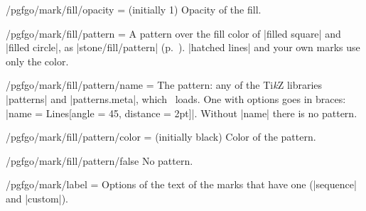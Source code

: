 \begin{key}{/pgfgo/mark/fill/opacity =  (initially 1)}
	Opacity of the fill.

	\begin{codeexample}[width=4cm]

		\begin{goban}[3]
		\end{goban}
	\end{codeexample}
\end{key}


\begin{key}{/pgfgo/mark/fill/pattern = }
	A pattern over the fill color of |filled square| and |filled circle|, as |stone/fill/pattern| (p.~\pageref{sec:piedras}). |hatched lines| and your own marks use only the color.

	\begin{codeexample}[width=4cm]
		\begin{goban}[3]
		\end{goban}
	\end{codeexample}
\end{key}

\begin{key}{/pgfgo/mark/fill/pattern/name = }
	The pattern: any of the Ti\emph{k}Z libraries |patterns| and |patterns.meta|, which \pgfgoname\ loads. One with options goes in braces: |name = {Lines[angle = 45, distance = 2pt]}|. Without |name| there is no pattern.
\end{key}

\begin{key}{/pgfgo/mark/fill/pattern/color =  (initially black)}
	Color of the pattern.
\end{key}

\begin{key}{/pgfgo/mark/fill/pattern/false}
	No pattern.
\end{key}


\begin{key}{/pgfgo/mark/label = }
	Options of the text of the marks that have one (|sequence| and |custom|).
\end{key}



